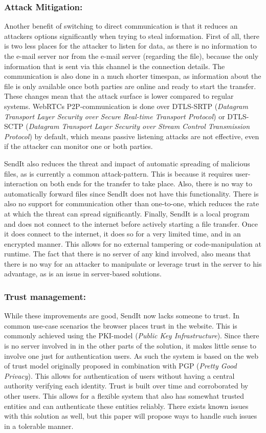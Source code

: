 \documentclass[runningheads]{llncs}
\begin{document}
\subsubsection{Attack Mitigation:}
Another benefit of switching to direct communication is that it reduces an attackers options significantly when trying to steal information. First of all, there is two less places for the attacker to listen for data, as there is no information to the e-mail server nor from the e-mail server (regarding the file), because the only information that is sent via this channel is the connection details. The communication is also done in a much shorter timespan, as information about the file is only available once both parties are online and ready to start the transfer. These changes mean that the attack surface is lower compared to regular systems. WebRTCs P2P-communication is done over DTLS-SRTP (\textit{Datagram Transport Layer Security over Secure Real-time Transport Protocol}) or DTLS-SCTP (\textit{Datagram Transport Layer Security over Stream Control Transmission Protocol}) by default\cite{ar_webrtc_dc}, which means passive listening attacks are not effective, even if the attacker can monitor one or both parties.

SendIt also reduces the threat and impact of automatic spreading of malicious files, as is currently a common attack-pattern. This is because it requires user-interaction on both ends for the transfer to take place. Also, there is no way to automatically forward files since SendIt does not have this functionality. There is also no support for communication other than one-to-one, which reduces the rate at which the threat can spread significantly.
Finally, SendIt is a local program and does not connect to the internet before actively starting a file transfer. Once it does connect to the internet, it does so for a very limited time, and in an encrypted manner. This allows for no external tampering or code-manipulation at runtime. The fact that there is no server of any kind involved, also means that there is no way for an attacker to manipulate or leverage trust in the server to his advantage, as is an issue in server-based solutions.
%
\subsubsection{Trust management:}
While these improvements are good, SendIt now lacks someone to trust. In common use-case scenarios the browser places trust in the website. This is commonly achieved using the PKI-model (\textit{Public Key Infrastructure}). Since there is no server involved in in the other parts of the solution, it makes little sense to involve one just for authentication users. As such the system is based on the web of trust model originally proposed in combination with PGP (\textit{Pretty Good Privacy}).\cite{ar_pgp} This allows for authentication of users without having a central authority verifying each identity. Trust is built over time and corroborated by other users. This allows for a flexible system that also has somewhat trusted entities and can authenticate these entities reliably. There exists known issues with this solution as well, but this paper will propose ways to handle such issues in a tolerable manner.
 
\end{document}
